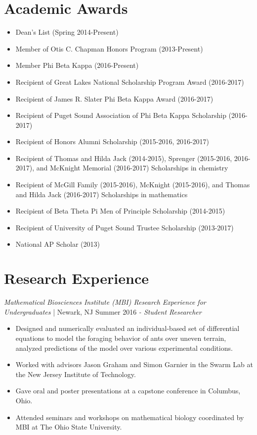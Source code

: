 \documentclass[letter]{res}
\begin{document}
\begin{resume}
\section{Academic Awards} 
 \begin{itemize}
 \item Dean's List (Spring 2014-Present)
 \item Member of Otis C. Chapman Honors Program (2013-Present)
 \item Member Phi Beta Kappa (2016-Present)
 \item Recipient of Great Lakes National Scholarship Program Award (2016-2017)
 \item Recipient of James R. Slater Phi Beta Kappa Award (2016-2017)
 \item Recipient of Puget Sound Association of Phi Beta Kappa Scholarship (2016-2017)
 \item Recipient of Honors Alumni Scholarship (2015-2016, 2016-2017)
 \item Recipient of Thomas and Hilda Jack (2014-2015), Sprenger (2015-2016, 2016-2017), and McKnight Memorial (2016-2017) Scholarships in chemistry 
 \item Recipient of McGill Family (2015-2016), McKnight (2015-2016), and Thomas and Hilda Jack (2016-2017) Scholarships in mathematics 
 \item Recipient of Beta Theta Pi Men of Principle Scholarship (2014-2015)
 \item Recipient of University of Puget Sound Trustee Scholarship (2013-2017)
 \item National AP Scholar (2013)
 \end{itemize}
\vspace{-3.5mm}

\section{Research Experience}
\textit{Mathematical Biosciences Institute (MBI) Research Experience for Undergraduates} | Newark, NJ \hfill Summer 2016 \newline 
\textit{- Student Researcher} \\
  \vspace{-4.5mm}
 \begin{itemize}
 \item Designed and numerically evaluated an individual-based set of differential equations to model the foraging behavior of ants over uneven terrain, analyzed predictions of the model over various experimental conditions.
  \item Worked with advisors Jason Graham and Simon Garnier in the Swarm Lab at the New Jersey Institute of Technology.
 \item Gave oral and poster presentations at a capstone conference in Columbus, Ohio.
 \item Attended seminars and workshops on mathematical biology coordinated by MBI at The Ohio State University.
 \end{itemize}
  \vspace{-3.5mm}


\end{resume}
\end{document}
